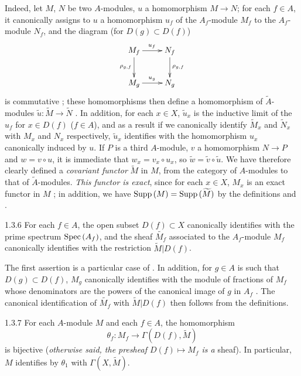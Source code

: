 Indeed, let $M$, $N$ be two $A$-modules, $u$ a homomorphism $M\to N$; for each $f\in A$,
it canonically assigns to $u$ a homomorphism $u_f$ of the $A_f$-module $M_f$ to the
$A_f$-module $N_f$, and the diagram (for $D(g)\subset D(f)$)
\[
  \xymatrix{
    M_f\ar[r]^{u_f}\ar[d]_{\rho_{g,f}} & N_f\ar[d]^{\rho_{g,f}}\\
    M_g\ar[r]^{u_g} & N_g
  }
\]
is commutative ; these homomorphisms then define a homomorphism of
$\widetilde{A}$-modules $\widetilde{u}:\widetilde{M}\to\widetilde{N}$ . In
addition, for each $x\in X$, $\widetilde{u}_x$ is the inductive limit of the $u_f$ for
$x\in D(f)$ ($f\in A$), and as a result  if we canonically identify
$\widetilde{M}_x$ and $\widetilde{N}_x$ with $M_x$ and $N_x$ respectively, $\widetilde{u}_x$
identifies with the homomorphism $u_x$ canonically induced by $u$. If $P$ is a third
$A$-module, $v$ a homomorphism $N\to P$ and $w=v\circ u$, it is immediate that
$w_x=v_x\circ u_x$, so $\widetilde{w}=\widetilde{v}\circ\widetilde{u}$. We have therefore
clearly defined a \emph{covariant functor} $\widetilde{M}$ in $M$, from the category of
$A$-modules to that of $\widetilde{A}$-modules. \emph{This functor is exact}, since for each
$x\in X$, $M_x$ is an exact functor in $M$ ; in addition, we have
${\mathop{\mathrm{Supp}}\nolimits}\,(M)={\mathop{\mathrm{Supp}}\nolimits}\,(\widetilde{M})$ by the definitions  and .

\begin{envs}[Proposition]{1.3.6}
\label{prop-1.1.3.6}
For each $f\in A$, the open subset $D(f)\subset X$ canonically identifies with the prime
spectrum ${\mathop{\mathrm{Spec}}\nolimits}\,(A_f)$, and the sheaf $\widetilde{M_f}$ associated to the $A_f$-module
$M_f$ canonically identifies with the restriction $\widetilde{M}|D(f)$.
\end{envs}

The first assertion is a particular case of . In addition, for $g\in A$ is
such that $D(g)\subset D(f)$, $M_g$ canonically identifies with the module of fractions of
$M_f$ whose denominators are the powers of the canonical image of $g$ in $A_f$
. The canonical identification of $\widetilde{M_f}$ with
$\widetilde{M}|D(f)$ then follows from the definitions.

\begin{envs}[Theorem]{1.3.7}
\label{thm-1.1.3.7}
For each $A$-module $M$ and each $f\in A$, the homomorphism
\[
  \theta_f:M_f\longrightarrow\Gamma(D(f),\widetilde{M})
\]
is bijective (\emph{otherwise said, the presheaf $D(f)\mapsto M_f$ is a} sheaf). In
particular, $M$ identifies by $\theta_1$ with $\Gamma(X,\widetilde{M})$.
\end{envs}

